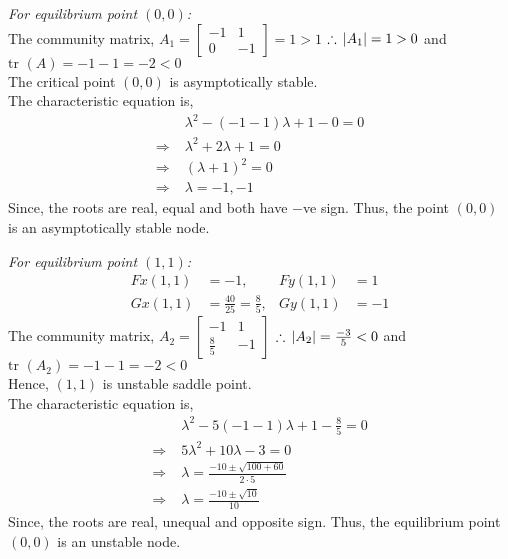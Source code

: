 \documentclass[../main-sheet.tex]{subfiles}
\begin{document}
\begin{soln}
    \emph{For equilibrium point \((0,0)\):}\\
    The community matrix, \(A_1=\begin{bmatrix}
        -1 & 1 \\
        0 & -1
    \end{bmatrix}=1>1\)
    \(\therefore \, \left\vert A_1\right\vert=1>0\) and \(\text{tr }(A)=-1-1=-2<0\)\\
    The critical point \((0,0)\) is asymptotically stable.\\
    The characteristic equation is,
    \begin{align*}
        &\lambda^2-(-1-1)\lambda+1-0=0\\
        \Rightarrow\;&\lambda^2+2\lambda+1=0\\
        \Rightarrow\;&(\lambda+1)^2=0\\
        \Rightarrow\;&\lambda=-1,-1
    \end{align*}
    Since, the roots are real, equal and both have \(-\)ve sign. Thus, the point \((0,0)\) is an asymptotically stable node.


    \emph{For equilibrium point \((1,1)\):}
    \begin{align*}
        Fx(1,1)&=-1, &Fy(1,1)&=1\\
        Gx(1,1)&=\frac{40}{25}=\frac{8}{5}, &Gy(1,1)&=-1
    \end{align*}
    The community matrix, \(A_2=\begin{bmatrix}
        -1 & 1 \\
        \frac{8}{5} & -1
    \end{bmatrix}\)
    \(\therefore \, \left\vert A_2\right\vert=\frac{-3}{5}<0\) and \(\text{tr }(A_2)=-1-1=-2<0\)\\
    Hence, \((1,1)\) is unstable saddle point.\\
    The characteristic equation is,
    \begin{align*}
        &\lambda^2-5(-1-1)\lambda+1-\frac{8}{5}=0\\
        \Rightarrow\;&5\lambda^2+10\lambda-3=0\\
        \Rightarrow\;&\lambda=\frac{-10\pm \sqrt{100+60}}{2\cdot5}\\
        \Rightarrow\;&\lambda=\frac{-10\pm \sqrt{10}}{10}
    \end{align*}
    Since, the roots are real, unequal and opposite sign. Thus, the equilibrium point \((0,0)\) is an unstable node.



\end{soln}
\end{document}

